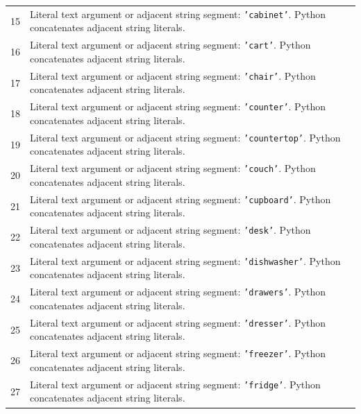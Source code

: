 \documentclass[11pt,a4paper]{book}
\begin{document}
\begin{longtable}{r p{}}
15 & Literal text argument or adjacent string segment: \texttt{'cabinet'}. Python concatenates adjacent string literals. \\

16 & Literal text argument or adjacent string segment: \texttt{'cart'}. Python concatenates adjacent string literals. \\

17 & Literal text argument or adjacent string segment: \texttt{'chair'}. Python concatenates adjacent string literals. \\

18 & Literal text argument or adjacent string segment: \texttt{'counter'}. Python concatenates adjacent string literals. \\

19 & Literal text argument or adjacent string segment: \texttt{'countertop'}. Python concatenates adjacent string literals. \\

20 & Literal text argument or adjacent string segment: \texttt{'couch'}. Python concatenates adjacent string literals. \\

21 & Literal text argument or adjacent string segment: \texttt{'cupboard'}. Python concatenates adjacent string literals. \\

22 & Literal text argument or adjacent string segment: \texttt{'desk'}. Python concatenates adjacent string literals. \\

23 & Literal text argument or adjacent string segment: \texttt{'dishwasher'}. Python concatenates adjacent string literals. \\

24 & Literal text argument or adjacent string segment: \texttt{'drawers'}. Python concatenates adjacent string literals. \\

25 & Literal text argument or adjacent string segment: \texttt{'dresser'}. Python concatenates adjacent string literals. \\

26 & Literal text argument or adjacent string segment: \texttt{'freezer'}. Python concatenates adjacent string literals. \\

27 & Literal text argument or adjacent string segment: \texttt{'fridge'}. Python concatenates adjacent string literals. \\


\end{longtable}
\end{document}
